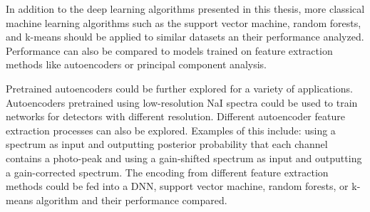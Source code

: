 In addition to the deep learning algorithms presented in this thesis, more classical machine learning algorithms such as the support vector machine, random forests, and k-means should be applied to similar datasets an their performance analyzed. Performance can also be compared to models trained on feature extraction methods like autoencoders or principal component analysis.

Pretrained autoencoders could be further explored for a variety of applications. Autoencoders pretrained using low-resolution NaI spectra could be used to train networks for detectors with different resolution. Different autoencoder feature extraction processes can also be explored. Examples of this include: using a spectrum as input and outputting posterior probability that each channel contains a photo-peak and using a gain-shifted spectrum as input and outputting a gain-corrected spectrum. The encoding from different feature extraction methods could be fed into a DNN, support vector machine, random forests, or k-means algorithm and their performance compared.











